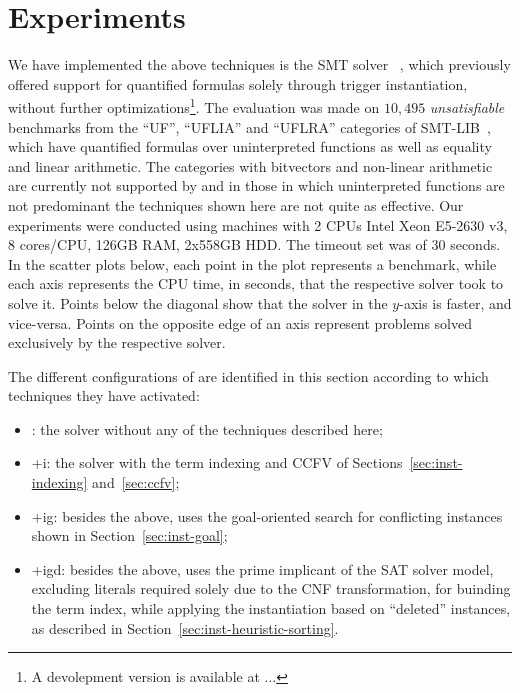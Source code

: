 \message{ !name(main.tex)}\documentclass{easychair}
\begin{document}
\section{Experiments}
\label{sec:experiments}

We have implemented the above techniques is the SMT solver
{\verit}~\cite{Bouton2009}, which previously offered support for
quantified formulas solely through trigger instantiation, without
further optimizations\footnote{A devolepment version is available at
  ...}. The evaluation was made on $10,495$ \emph{unsatisfiable}
benchmarks from the ``UF'', ``UFLIA'' and ``UFLRA'' categories of
SMT-LIB~\cite{Barrett2010}, which have quantified formulas over
uninterpreted functions as well as equality and linear arithmetic. The
categories with bitvectors and non-linear arithmetic are currently not
supported by {\verit} and in those in which uninterpreted functions
are not predominant the techniques shown here are not quite as
effective. Our experiments were conducted using machines with 2 CPUs
Intel Xeon E5-2630 v3, 8 cores/CPU, 126GB RAM, 2x558GB HDD. The
timeout set was of 30 seconds. In the scatter plots below, each point
in the plot represents a benchmark, while each axis represents the CPU
time, in seconds, that the respective solver took to solve it. Points
below the diagonal show that the solver in the $y$-axis is faster, and
vice-versa. Points on the opposite edge of an axis represent problems
solved exclusively by the respective solver.

The different configurations of {\verit} are identified in this section according to which techniques they have activated:
\begin{itemize}
  \item {\verit}: the solver without any of the techniques described here;
  \item {\verit}+i: the solver with the term indexing and CCFV of Sections~\ref{sec:inst-indexing} and~\ref{sec:ccfv};
  \item {\verit}+ig: besides the above, uses the goal-oriented search
  for conflicting instances shown in Section~\ref{sec:inst-goal};
  \item {\verit}+igd: besides the above, uses the prime implicant of
  the SAT solver model, excluding literals required solely due to the
  CNF transformation, for buinding the term index, while applying the
   instantiation based on ``deleted'' instances, as described in Section~\ref{sec:inst-heuristic-sorting}.
\end{itemize}
\end{document}
